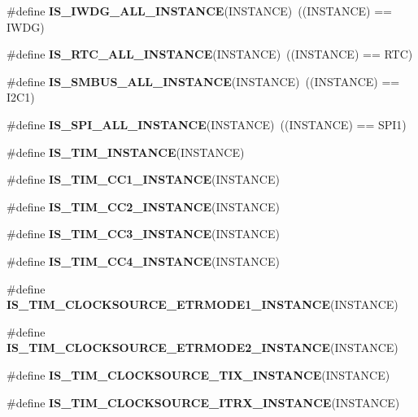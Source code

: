 \begin{DoxyCompactItemize}
\#define {\bfseries I\+S\+\_\+\+I\+W\+D\+G\+\_\+\+A\+L\+L\+\_\+\+I\+N\+S\+T\+A\+N\+CE}(I\+N\+S\+T\+A\+N\+CE)~((I\+N\+S\+T\+A\+N\+CE) == I\+W\+DG)
\item 
\mbox{\label{group___exported__macro_gab4230e8bd4d88adc4250f041d67375ce}} 
\#define {\bfseries I\+S\+\_\+\+R\+T\+C\+\_\+\+A\+L\+L\+\_\+\+I\+N\+S\+T\+A\+N\+CE}(I\+N\+S\+T\+A\+N\+CE)~((I\+N\+S\+T\+A\+N\+CE) == R\+TC)
\item 
\mbox{\label{group___exported__macro_gaf492fcfe71eab8d1dadf4d837b840af6}} 
\#define {\bfseries I\+S\+\_\+\+S\+M\+B\+U\+S\+\_\+\+A\+L\+L\+\_\+\+I\+N\+S\+T\+A\+N\+CE}(I\+N\+S\+T\+A\+N\+CE)~((I\+N\+S\+T\+A\+N\+CE) == I2\+C1)
\item 
\mbox{\label{group___exported__macro_ga59c7619a86c03df3ebeb4bd8aaef982c}} 
\#define {\bfseries I\+S\+\_\+\+S\+P\+I\+\_\+\+A\+L\+L\+\_\+\+I\+N\+S\+T\+A\+N\+CE}(I\+N\+S\+T\+A\+N\+CE)~((I\+N\+S\+T\+A\+N\+CE) == S\+P\+I1)
\item 
\#define {\bfseries I\+S\+\_\+\+T\+I\+M\+\_\+\+I\+N\+S\+T\+A\+N\+CE}(I\+N\+S\+T\+A\+N\+CE)
\item 
\#define {\bfseries I\+S\+\_\+\+T\+I\+M\+\_\+\+C\+C1\+\_\+\+I\+N\+S\+T\+A\+N\+CE}(I\+N\+S\+T\+A\+N\+CE)
\item 
\#define {\bfseries I\+S\+\_\+\+T\+I\+M\+\_\+\+C\+C2\+\_\+\+I\+N\+S\+T\+A\+N\+CE}(I\+N\+S\+T\+A\+N\+CE)
\item 
\#define {\bfseries I\+S\+\_\+\+T\+I\+M\+\_\+\+C\+C3\+\_\+\+I\+N\+S\+T\+A\+N\+CE}(I\+N\+S\+T\+A\+N\+CE)
\item 
\#define {\bfseries I\+S\+\_\+\+T\+I\+M\+\_\+\+C\+C4\+\_\+\+I\+N\+S\+T\+A\+N\+CE}(I\+N\+S\+T\+A\+N\+CE)
\item 
\#define {\bfseries I\+S\+\_\+\+T\+I\+M\+\_\+\+C\+L\+O\+C\+K\+S\+O\+U\+R\+C\+E\+\_\+\+E\+T\+R\+M\+O\+D\+E1\+\_\+\+I\+N\+S\+T\+A\+N\+CE}(I\+N\+S\+T\+A\+N\+CE)
\item 
\#define {\bfseries I\+S\+\_\+\+T\+I\+M\+\_\+\+C\+L\+O\+C\+K\+S\+O\+U\+R\+C\+E\+\_\+\+E\+T\+R\+M\+O\+D\+E2\+\_\+\+I\+N\+S\+T\+A\+N\+CE}(I\+N\+S\+T\+A\+N\+CE)
\item 
\#define {\bfseries I\+S\+\_\+\+T\+I\+M\+\_\+\+C\+L\+O\+C\+K\+S\+O\+U\+R\+C\+E\+\_\+\+T\+I\+X\+\_\+\+I\+N\+S\+T\+A\+N\+CE}(I\+N\+S\+T\+A\+N\+CE)
\item 
\#define {\bfseries I\+S\+\_\+\+T\+I\+M\+\_\+\+C\+L\+O\+C\+K\+S\+O\+U\+R\+C\+E\+\_\+\+I\+T\+R\+X\+\_\+\+I\+N\+S\+T\+A\+N\+CE}(I\+N\+S\+T\+A\+N\+CE)

\end{DoxyCompactItemize}
